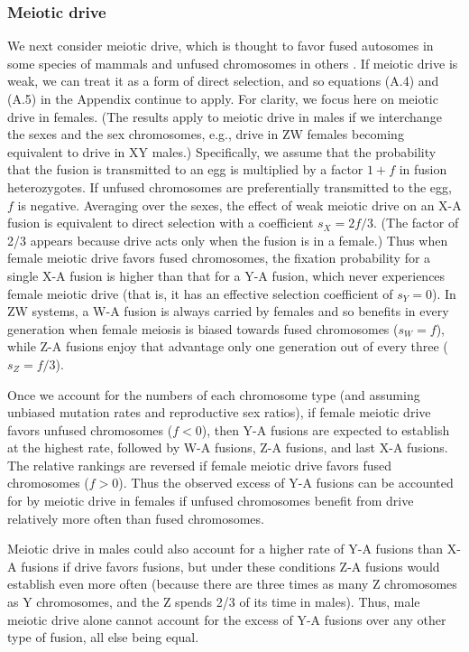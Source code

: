 \subsubsection{Meiotic drive}
We next consider meiotic drive, which is thought to favor fused autosomes in some species of mammals and unfused chromosomes in others \citep{Pando2001a, Pando2001b}. If meiotic drive is weak, we can treat it as a form of direct selection, and so equations (A.4) and (A.5) in the Appendix continue to apply. For clarity, we focus here on meiotic drive in females. (The results apply to meiotic drive in males if we interchange the sexes and the sex chromosomes, e.g., drive in ZW females becoming equivalent to drive in XY males.) Specifically, we assume that the probability that the fusion is transmitted to an egg is multiplied by a factor $1+f$ in fusion heterozygotes. If unfused chromosomes are preferentially transmitted to the egg, $f$ is negative. Averaging over the sexes, the effect of weak meiotic drive on an X-A fusion is equivalent to direct selection with a coefficient $s_X = 2f/3$. (The factor of 2/3 appears because drive acts only when the fusion is in a female.) Thus when female meiotic drive favors fused chromosomes, the fixation probability for a single X-A fusion is higher than that for a Y-A fusion, which never experiences female meiotic drive (that is, it has an effective selection coefficient of $s_Y=\text{0}$). In ZW systems, a W-A fusion is always carried by females and so benefits in every generation when female meiosis is biased towards fused chromosomes ($s_W=f$), while Z-A fusions enjoy that advantage only one generation out of every three ($s_Z = f/3$).
 
Once we account for the numbers of each chromosome type (and assuming unbiased mutation rates and reproductive sex ratios), if female meiotic drive favors unfused chromosomes ($f < \text{0}$), then Y-A fusions are expected to establish at the highest rate, followed by W-A fusions, Z-A fusions, and last X-A fusions. The relative rankings are reversed if female meiotic drive favors fused chromosomes ($f > \text{0}$). Thus the observed excess of Y-A fusions can be accounted for by meiotic drive in females if unfused chromosomes benefit from drive relatively more often than fused chromosomes.

Meiotic drive in males could also account for a higher rate of Y-A fusions than X-A fusions if drive favors fusions, but under these conditions Z-A fusions would establish even more often (because there are three times as many Z chromosomes as Y chromosomes, and the Z spends 2/3 of its time in males). Thus, male meiotic drive alone cannot account for the excess of Y-A fusions over any other type of fusion, all else being equal.

